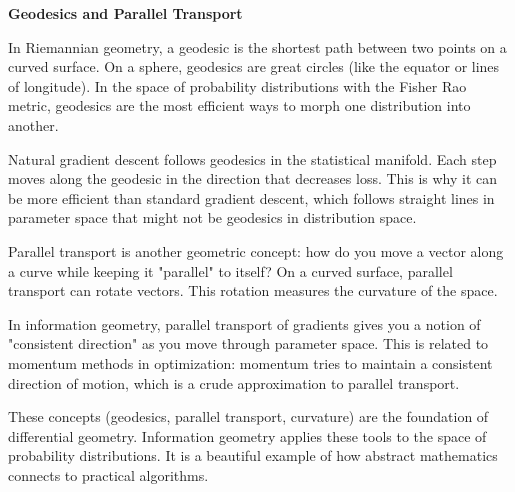 \begin{geometrylens}
\textbf{Geodesics and Parallel Transport}

\vspace{0.5em}

In Riemannian geometry, a geodesic is the shortest path between two points on a curved surface. On a sphere, geodesics are great circles (like the equator or lines of longitude). In the space of probability distributions with the Fisher Rao metric, geodesics are the most efficient ways to morph one distribution into another.

\vspace{0.5em}

Natural gradient descent follows geodesics in the statistical manifold. Each step moves along the geodesic in the direction that decreases loss. This is why it can be more efficient than standard gradient descent, which follows straight lines in parameter space that might not be geodesics in distribution space.

\vspace{0.5em}

Parallel transport is another geometric concept: how do you move a vector along a curve while keeping it "parallel" to itself? On a curved surface, parallel transport can rotate vectors. This rotation measures the curvature of the space.

\vspace{0.5em}

In information geometry, parallel transport of gradients gives you a notion of "consistent direction" as you move through parameter space. This is related to momentum methods in optimization: momentum tries to maintain a consistent direction of motion, which is a crude approximation to parallel transport.

\vspace{0.5em}

These concepts (geodesics, parallel transport, curvature) are the foundation of differential geometry. Information geometry applies these tools to the space of probability distributions. It is a beautiful example of how abstract mathematics connects to practical algorithms.
\end{geometrylens}

\vspace{2em}


